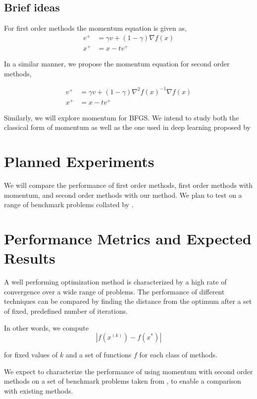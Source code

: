 \documentclass{article}
\begin{document}
\subsection{Brief ideas}

For first order methods the momentum equation is given as,
\begin{align*}
v^{+} &= \gamma v + (1-\gamma) \nabla f(x) \\
x^{+} &= x - tv^{+}
\end{align*}

In a similar manner, we propose the momentum equation for second order methods,

\begin{align*}
v^{+} &= \gamma v + (1-\gamma) \nabla^2 f(x)^{-1} \nabla f(x) \\
x^{+} &= x - tv^{+}
\end{align*}

Similarly, we will explore momentum for BFGS. We intend to study both the classical form of momentum \citep{POLYAK19641} as well as the one used in deep learning proposed by \citet{Sutskever}

\section{Planned Experiments}

We will compare the performance of first order methods, first order methods with momentum, and second order methods with our method. We plan to test on a range of benchmark problems collated by \citet{jamil2013literature}.

\section{Performance Metrics and Expected Results}

A well performing optimization method is characterized by a high rate of convergence over a wide range of problems. The performance of different techniques can be compared by finding the distance from the optimum after a set of fixed, predefined number of iterations.

In other words, we compute
\begin{equation}
|f(x^{(k)}) - f(x^*)|
\end{equation}

for fixed values of $k$ and a set of functions $f$ for each class of methods.

We expect to characterize the performance of using momentum with second order methods on a set of benchmark problems taken from \citep{jamil2013literature}, to enable a comparison with existing methods.



\end{document}
